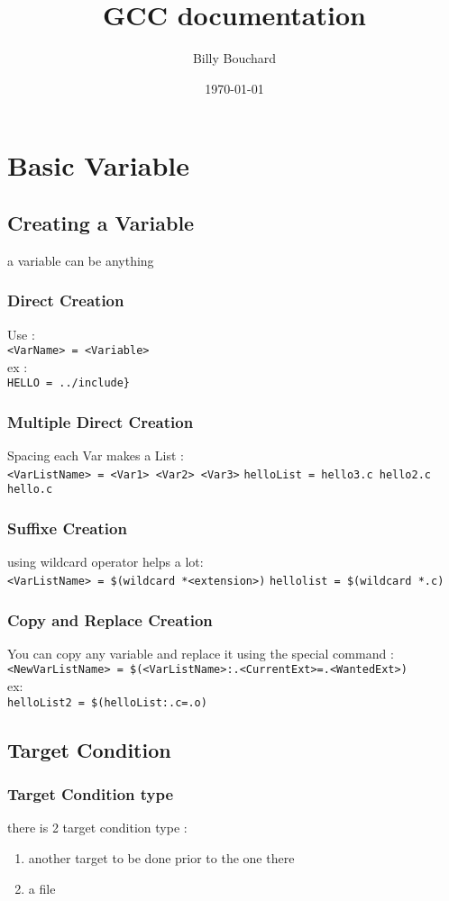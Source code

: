 \documentclass[12pt]{article}
\author{Billy Bouchard}
\title{GCC documentation}
\date{\today}
\begin{document}
\maketitle
\tableofcontents
\newpage
\section{Basic Variable}
\subsection{Creating a Variable}
a variable can be anything
\subsubsection{Direct Creation}
Use : \\
\verb|<VarName> = <Variable>|\\
ex : \\
\verb|HELLO = ../include}|

\subsubsection{Multiple Direct Creation}
Spacing each Var makes a List : \\
\verb|<VarListName> = <Var1> <Var2> <Var3>|
\verb|helloList = hello3.c hello2.c hello.c |

\subsubsection{Suffixe Creation}
using wildcard operator helps a lot:\\
\verb|<VarListName> = $(wildcard *<extension>)|
\verb|hellolist = $(wildcard *.c)|

\subsubsection{Copy and Replace Creation}
You can copy any variable and replace it using the special command :
\verb|<NewVarListName> = $(<VarListName>:.<CurrentExt>=.<WantedExt>)|\\
ex: \\
\verb|helloList2 = $(helloList:.c=.o)|
\newpage
\subsection{Target Condition}
\subsubsection{Target Condition type}
there is 2 target condition type :
\begin{enumerate}
 \item another target to be done prior to the one there
 \item a file
\end{enumerate}
\end{document}
